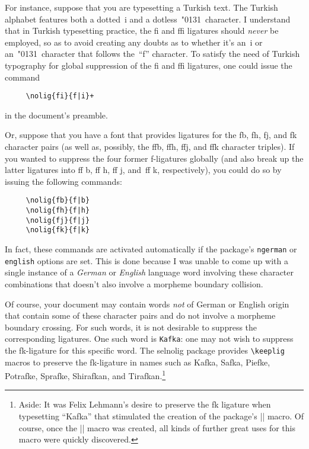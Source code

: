 \documentclass[11pt]{article}
\newcommand{\pkg}[1]{\textsf{#1}}
\newcommand{\opt}[1]{\texttt{#1}}
\newcommand{\cmmd}[1]{\texttt{\textbackslash #1}}
\begin{document}
For instance, suppose that you are typesetting a Turkish text. The Turkish alphabet features both a dotted~i and a dotless~\char"0131\ character. I understand that in Turkish typesetting practice, the fi and ffi ligatures should \emph{never} be employed, so as to avoid creating any doubts as to whether it's an~i or an~\char"0131\ character that follows the~\enquote{f} character. To satisfy the need of Turkish typography for global suppression of the fi and ffi ligatures, one could issue the command
\begin{Verbatim}
     \nolig{fi}{f|i}+
\end{Verbatim}
in the document's preamble.


Or, suppose that you have a font that provides ligatures for the {\ebg \mbox{fb}, \mbox{fh}, \mbox{fj}, and \mbox{fk}} character pairs (as well as, possibly, the {\ebg \mbox{ffb}, \mbox{ffh}, \mbox{ffj}, and \mbox{ffk}} character triples). If you wanted to suppress the four former f-ligatures globally (and also break up the latter ligatures into ff\kern0pt b, ff\kern0pt h, ff\kern0pt j, and~ff\kern0pt k, respectively), you could do so by issuing the following commands: 
\begin{Verbatim}
     \nolig{fb}{f|b}
     \nolig{fh}{f|h}
     \nolig{fj}{f|j}
     \nolig{fk}{f|k}
\end{Verbatim}
In fact, these commands are activated automatically if the package's \opt{ngerman} or \opt{english} options are set. This is done because I was unable to come up with a single instance of a \emph{German} or \emph{English} language word involving these character combinations that doesn't also involve a morpheme boundary collision.

Of course, your document may contain words \emph{not} of German or English origin that contain some of these character pairs and do not involve a morpheme boundary crossing. For such words, it is not desirable to suppress the corresponding ligatures. One such word is \opt{Kafka}: one may not wish to suppress the {\ebg\mbox{fk}}-ligature for this specific word. The \pkg{selnolig} package provides \cmmd{keeplig} macros to preserve the {\ebg\mbox{fk}}-ligature in names such as {\ebg Kafka, Safka, Piefke, Potrafke, Sprafke, Shirafkan, and Tirafkan}.\footnote{Aside: It was Felix Lehmann's desire to preserve the {\ebg\mbox{fk}} ligature when typesetting \enquote{{\ebg Kafka}} that stimulated the creation of the package's |\keeplig| macro. Of course, once the |\keeplig| macro was created, all kinds of further great uses for this macro were quickly discovered.} 
\end{document}
